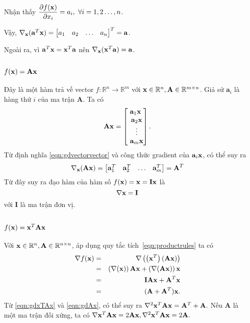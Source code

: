 Nhận thấy $\dfrac{\partial f(\mathbf{x})}{\partial x_i} = a_i, ~
\forall i = 1, 2\dots, n$.

\smallvspace
Vậy, $\nabla_{\mathbf{x}} (\mathbf{a}^T\mathbf{x}) = \left[\begin{matrix} a_1 & a_2 & \dots & a_n \end{matrix}\right]^T = \mathbf{a}$.

Ngoài ra, vì $\mathbf{a}^T\mathbf{x} = \mathbf{x}^T\mathbf{a}$ nên $\nabla_{\mathbf{x}} (\mathbf{x}^T\mathbf{a}) =
\mathbf{a}$.


\subsection{$f(\mathbf{x}) = \mathbf{Ax}$}
Đây là một hàm trả về vector $f: \mathbb{R}^n \rightarrow \mathbb{R}^{m} $ với
$\mathbf{x} \in \mathbb{R}^n, \mathbf{A} \in \mathbb{R}^{m\times n}$. Giả sử
$\mathbf{a}_i$ là {hàng} thứ $i$ của ma trận $\mathbf{A}$. Ta có
\begin{equation*}
\mathbf{Ax}  =
\left[\begin{matrix}
\mathbf{a}_1\mathbf{x} \\\
\mathbf{a}_2\mathbf{x} \\\
\vdots\\\
\mathbf{a}_m\mathbf{x}
\end{matrix}\right].
\end{equation*}
Từ định nghĩa \eqref{eqn:gdvectorvector} và công thức gradient của $\mathbf{a}_i\mathbf{x}$,
có thể suy ra
\begin{equation}
\label{eqn:gdAx}
\nabla_{\mathbf{x}} (\mathbf{Ax}) =
\left[\begin{matrix}
\mathbf{a}_1^T & \mathbf{a}_2^T & \dots & \mathbf{a}_m^T
\end{matrix}\right] = \mathbf{A}^T
\end{equation}
Từ đây suy ra đạo hàm của hàm số $f(\mathbf{x}) = \mathbf{x} = \mathbf{Ix}$ là
\begin{equation*}
\nabla \mathbf{x} = \mathbf{I}
\end{equation*}
với
$\mathbf{I}$ là ma trận đơn vị.

\subsection{$f(\mathbf{x}) = \mathbf{x}^T\mathbf{A} \mathbf{x}$}
Với $\mathbf{x} \in \mathbb{R}^n, \mathbf{A} \in \mathbb{R}^{n\times n}$, áp dụng quy
tắc tích~\eqref{eqn:productrules} ta có
\begin{eqnarray}
\nonumber
\nabla f(\mathbf{x}) &=& \nabla \left(\left(\mathbf{x}^T\right) \left(\mathbf{Ax}\right)\right) \\\
\nonumber
&=& \left(\nabla (\mathbf{x})\right) \mathbf{Ax} + \left(\nabla (\mathbf{Ax})\right)\mathbf{x} \\\
\nonumber
& = & \mathbf{IAx} + \mathbf{A}^T\mathbf{x} \\\
\label{eqn:gdxTAx}
& = & (\mathbf{A} + \mathbf{A}^T)\mathbf{x}.
\end{eqnarray}
Từ \eqref{eqn:gdxTAx} và \eqref{eqn:gdAx}, có thể suy ra
\begin{math}
\nabla^2 \mathbf{x}^T\mathbf{Ax} = \mathbf{A}^T + \mathbf{A}.
\end{math}
Nếu $\mathbf{A}$ là một ma trận đối xứng, ta có
$
\nabla \mathbf{x}^T\mathbf{A}\mathbf{x} = 2\mathbf{Ax},
\nabla^2 \mathbf{x}^T\mathbf{Ax} = 2\mathbf{A}.
$

